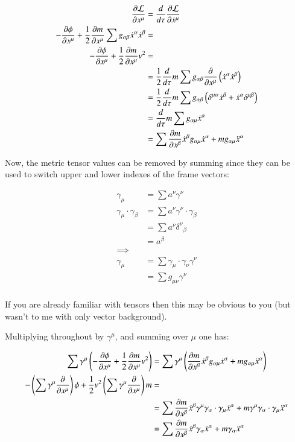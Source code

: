 \documentclass{article}      %
\newcommand{\LL}[0]{\mathcal{L}}
\newcommand{\PD}[2]{\frac{\partial {#2}}{\partial {#1}}}
\newcommand{\xdot}[0]{\dot{x}}
\newcommand{\xddot}[0]{\ddot{x}}
\begin{document}
\begin{align*}
\PD{x^{\mu}}{\LL} &= \frac{d}{d\tau} \PD{\xdot^{\mu}}{\LL} \\
- \PD{x^{\mu}}{\phi} + \inv{2} \PD{x^{\mu}}{m} \sum g_{\alpha\beta} \xdot^{\alpha} \xdot^{\beta} &= \\
- \PD{x^{\mu}}{\phi} + \inv{2} \PD{x^{\mu}}{m} v^2 &= \\
&= \inv{2} \frac{d}{d\tau} m \sum g_{\alpha\beta} \PD{x^{\mu}}{}\left(\xdot^{\alpha} \xdot^{\beta}\right) \\
&= \inv{2} \frac{d}{d\tau} m \sum g_{\alpha\beta} \left(\delta^{\mu\alpha} \xdot^{\beta} + \xdot^{\alpha} \delta^{\mu\beta}\right) \\
&= \frac{d}{d\tau} m \sum g_{\alpha\mu} \xdot^{\alpha} \\
&= \sum \PD{x^{\beta}}{m} \xdot^{\beta} g_{\alpha\mu} \xdot^{\alpha} + m g_{\alpha\mu} \xddot^{\alpha} \\
\end{align*}

Now, the metric tensor values can be removed by summing since they can be used to switch upper and lower indexes of the frame vectors:

\begin{align*}
\gamma_{\mu} &= \sum a^{\nu} \gamma^{\nu} \\
\gamma_{\mu} \cdot \gamma_{\beta}
&= \sum a^{\nu} \gamma^{\nu} \cdot \gamma_{\beta} \\
&= \sum a^{\nu} {\delta^{\nu}}_{\beta} \\
&= a^{\beta} \\
\implies \\
\gamma_{\mu}
&= \sum \gamma_{\mu} \cdot \gamma_{\nu} \gamma^{\nu} \\
&= \sum g_{\mu\nu} \gamma^{\nu} \\
\end{align*}

If you are already familiar with tensors then this may be obvious to you (but wasn't to me with only vector background).

Multiplying throughout by $\gamma^{\mu}$, and summing over $\mu$ one has:

\begin{align*}
\sum \gamma^{\mu} \left( - \PD{x^{\mu}}{\phi} + \inv{2} \PD{x^{\mu}}{m} v^2 \right) 
&= \sum \gamma^{\mu} \left(\PD{x^{\beta}}{m} \xdot^{\beta} g_{\alpha\mu} \xdot^{\alpha} + m g_{\alpha\mu} \xddot^{\alpha} \right) \\
- \left(\sum \gamma^{\mu} \PD{x^{\mu}}{}\right) \phi + \inv{2} v^2 \left(\sum \gamma^{\mu} \PD{x^{\mu}}{}\right) m &= \\
&= \sum \PD{x^{\beta}}{m} \xdot^{\beta} \gamma^{\mu} \gamma_{\alpha} \cdot \gamma_{\mu} \xdot^{\alpha} + m \gamma^{\mu} \gamma_{\alpha} \cdot \gamma_{\mu} \xddot^{\alpha}  \\
&= \sum \PD{x^{\beta}}{m} \xdot^{\beta} \gamma_{\alpha} \xdot^{\alpha} + m \gamma_{\alpha} \xddot^{\alpha}  \\
\end{align*}
\end{document}
